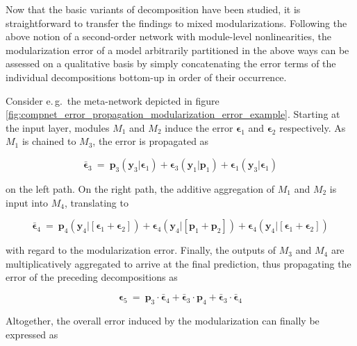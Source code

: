 Now that the basic variants of decomposition have been studied, it is straightforward to transfer the findings to mixed modularizations. Following the above notion of a second-order network with module-level nonlinearities, the modularization error of a model arbitrarily partitioned in the above ways can be assessed on a qualitative basis by simply concatenating the error terms of the individual decompositions bottom-up in order of their occurrence.

Consider e.\,g.\ the meta-network depicted in figure \ref{fig:compnet_error_propagation_modularization_error_example}. Starting at the input layer, modules $M_1$ and $M_2$ induce the error $\boldsymbol{\epsilon}_1$ and $\boldsymbol{\epsilon}_2$ respectively. As $M_1$ is chained to $M_3$, the error is propagated as

\begin{equation*}
    \bar{\boldsymbol{\epsilon}}_3\ =\ %
    \textbf{p}_3(\textbf{y}_3|\boldsymbol{\epsilon}_1)+\boldsymbol{\epsilon}_3(\textbf{y}_1|\textbf{p}_1)+\boldsymbol{\epsilon}_1(\textbf{y}_3|\boldsymbol{\epsilon}_1)
\end{equation*}

on the left path. On the right path, the additive aggregation of $M_1$ and $M_2$ is input into $M_4$, translating to

\begin{equation*}
    \bar{\boldsymbol{\epsilon}}_4\ =\ %
    \textbf{p}_4(\textbf{y}_4|[\boldsymbol{\epsilon}_1+\boldsymbol{\epsilon}_2])+\boldsymbol{\epsilon}_4(\textbf{y}_4|[\textbf{p}_1+\textbf{p}_2])+\boldsymbol{\epsilon}_4(\textbf{y}_4|[\boldsymbol{\epsilon}_1+\boldsymbol{\epsilon}_2])
\end{equation*}

with regard to the modularization error. Finally, the outputs of $M_3$ and $M_4$ are multiplicatively aggregated to arrive at the final prediction, thus propagating the error of the preceding decompositions as

\begin{equation*}
    \boldsymbol{\epsilon}_5\ =\ %
    \textbf{p}_3\cdot\bar{\boldsymbol{\epsilon}}_4+\bar{\boldsymbol{\epsilon}}_3\cdot\textbf{p}_4+\bar{\boldsymbol{\epsilon}}_3\cdot\bar{\boldsymbol{\epsilon}}_4
\end{equation*}

Altogether, the overall error induced by the modularization can finally be expressed as

